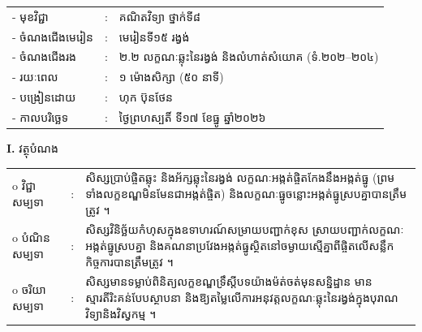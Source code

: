 \documentclass[a4paper,10pt]{article}
\newcommand{\wcirc}{{\CourierBullet\fontsize{9.5pt}{11pt}\selectfont o}}
\begin{document}
{\renewcommand{\arraystretch}{0.95}
\hspace*{4.05cm}%
\begin{tabular}{@{}l l l@{}}
  - \hspace{0.35cm} មុខវិជ្ជា & : & គណិតវិទ្យា ថ្នាក់ទី៨ \\
  - \hspace{0.35cm} ចំណងជើងមេរៀន & : & មេរៀនទី១៥ រង្វង់ \\
  - \hspace{0.35cm} ចំណងជើងរង & : & ២.២ លក្ខណៈឆ្លុះនៃរង្វង់ និងលំហាត់សំយោគ (ទំ.២០២--២០៤) \\
  - \hspace{0.35cm} រយៈពេល & : & ១ ម៉ោងសិក្សា (៥០ នាទី) \\
  - \hspace{0.35cm} បង្រៀនដោយ & : & ហុក ប៊ុនថែន \\
  - \hspace{0.35cm} កាលបរិច្ឆេទ & : & ថ្ងៃព្រហស្បតិ៍ ទី១៧ ខែធ្នូ ឆ្នាំ២០២៦ \\
\end{tabular}

\vspace{1pt}

\textbf{I.} {\muol វត្ថុបំណង}\\[1pt]
\hspace*{0.55cm}%
\begin{tabular}{@{}l l L{14.2cm}@{}}
  \wcirc \hspace{0.25cm} វិជ្ជាសម្បទា & : & សិស្សប្រាប់ផ្ចិតឆ្លុះ និងអ័ក្សឆ្លុះនៃរង្វង់ លក្ខណៈអង្កត់ផ្ចិតកែងនឹងអង្កត់ធ្នូ (ព្រមទាំងលក្ខខណ្ឌមិនមែនជាអង្កត់ផ្ចិត) និងលក្ខណៈធ្នូចន្លោះអង្កត់ធ្នូស្របគ្នាបានត្រឹមត្រូវ ។ \\
  \wcirc \hspace{0.25cm} បំណិនសម្បទា & : & សិស្សវិនិច្ឆ័យកំហុសក្នុងឧទាហរណ៍សម្រាយបញ្ជាក់ខុស ស្រាយបញ្ជាក់លក្ខណៈអង្កត់ធ្នូស្របគ្នា និងគណនាប្រវែងអង្កត់ធ្នូស្ថិតនៅចម្ងាយស្មើគ្នាពីផ្ចិតលើសន្លឹកកិច្ចការបានត្រឹមត្រូវ ។ \\
  \wcirc \hspace{0.25cm} ចរិយាសម្បទា & : & សិស្សមានទម្លាប់ពិនិត្យលក្ខខណ្ឌទ្រឹស្ដីបទយ៉ាងម៉ត់ចត់មុនសន្និដ្ឋាន មានស្មារតីរិះគន់បែបស្ថាបនា និងឱ្យតម្លៃលើការអនុវត្តលក្ខណៈឆ្លុះនៃរង្វង់ក្នុងបុរាណវិទ្យានិងវិស្វកម្ម ។ \\
\end{tabular}

\vspace{1pt}

}
\end{document}
